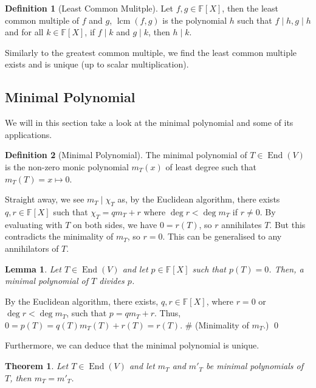 \documentclass[
]{article}
\newtheorem{theorem}{Theorem}
\newtheorem{lemma}{Lemma}[section]
\theoremstyle{definition}
\newtheorem{definition}{Definition}[section]
\begin{document}
\begin{definition}[Least Common Mulitple]
  Let \(f, g \in \mathbb{F}[X]\), then the least common multiple of \(f\) and 
  \(g\), \(\mathop{\mathrm{lcm}}(f, g)\) is the polynomial \(h\) such that \(f \mid h, g \mid h\) 
  and for all \(k \in \mathbb{F}[X]\), if \(f \mid k\) and \(g \mid k\), then 
  \(h \mid k\).
\end{definition}

Similarly to the greatest common multiple, we find the least common
multiple exists and is unique (up to scalar multiplication).

\hypertarget{minimal-polynomial}{%
\subsection{Minimal Polynomial}\label{minimal-polynomial}}

We will in this section take a look at the minimal polynomial and some
of its applications.

\begin{definition}[Minimal Polynomial]
  The minimal polynomial of \(T \in \mathop{\mathrm{End}}(V)\) is the non-zero monic polynomial 
  \(m_T(x)\) of least degree such that \(m_T(T) = x \mapsto 0\).
\end{definition}

Straight away, we see \(m_T \mid \chi_T\) as, by the Euclidean
algorithm, there exists \(q, r \in \mathbb{F}[X]\) such that
\(\chi_T = q m_T + r\) where \(\deg r < \deg m_T\) if \(r \neq 0\). By
evaluating with \(T\) on both sides, we have \(0 = r(T)\), so \(r\)
annihilates \(T\). But this contradicts the minimality of \(m_T\), so
\(r = 0\). This can be generalised to any annihilators of \(T\).

\begin{lemma}
  Let \(T \in \mathop{\mathrm{End}}(V)\) and let \(p \in \mathbb{F}[X]\) such that \(p(T) = 0\). 
  Then, a minimal polynomial of \(T\) divides \(p\). 
\end{lemma}
\proof

By the Euclidean algorithm, there exists, \(q, r \in \mathbb{F}[X]\),
where \(r = 0\) or \(\deg r < \deg m_T\), such that \(p = qm_T + r\).
Thus, \(0 = p(T) = q(T) m_T(T) + r(T) = r(T)\). \# (Minimality of
\(m_T\).) \qed

Furthermore, we can deduce that the minimal polynomial is unique.

\begin{theorem}
  Let \(T \in \mathop{\mathrm{End}}(V)\) and let \(m_T\) and \(m'_T\) be minimal polynomials of 
  \(T\), then \(m_T = m'_T\).
\end{theorem}
\proof
\end{document}
